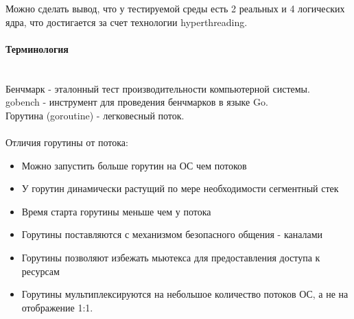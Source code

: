 \documentclass[utf8x, 12pt]{G7-32} %
\begin{document}
Можно сделать вывод, что у тестируемой среды есть 2 реальных и 4 логических ядра, что достигается за счет технологии hyperthreading.

\newpage

\paragraph{Терминология}
\\
Бенчмарк - эталонный тест производительности компьютерной системы.\\
gobench - инструмент для проведения бенчмарков в языке Go.\\
Горутина (goroutine) - легковесный поток.\\
\\
Отличия горутины от потока:

\begin{itemize}
	\item Можно запустить больше горутин на ОС чем потоков
	\item У горутин динамически растущий по мере необходимости сегментный стек
	\item Время старта горутины меньше чем у потока
	\item Горутины поставляются с механизмом безопасного общения - каналами
	\item Горутины позволяют избежать мьютекса для предоставления доступа к ресурсам
	\item Горутины мультиплексируются на небольшое количество потоков ОС, а не на отображение 1:1.
\end{itemize}

\newpage
\end{document}
